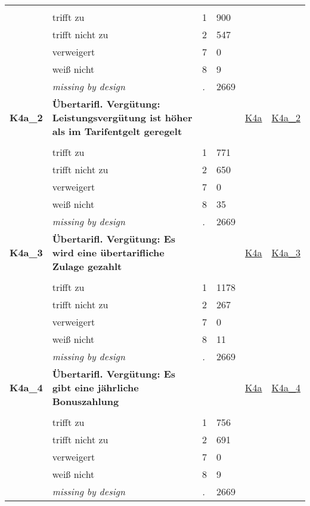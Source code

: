 \begin{longtable}{| L{2.45cm} | L{6cm} | C{1.5cm} | R{1cm} | C{2.25cm} | C{2.25cm} |}
   &  &  &  &  &  \\ 
   & trifft zu & 1 & 900 &  &  \\ 
   & trifft nicht zu & 2 & 547 &  &  \\ 
   & verweigert & 7 & 0 &  &  \\ 
   & weiß nicht & 8 & 9 &  &  \\ 
   & \textit{missing by design} & \textit{.} & 2669 &  &  \\ 
   \midrule
\textbf{K4a\_2}\label{var:K4a:2} & \textbf{Übertarifl. Vergütung: Leistungsvergütung ist höher als im Tarifentgelt geregelt} &  &  & \hyperref[K4a]{K4a} & \hyperref[var:suf:K4a:2]{K4a\_2} \\ 
   &  &  &  &  &  \\ 
   & trifft zu & 1 & 771 &  &  \\ 
   & trifft nicht zu & 2 & 650 &  &  \\ 
   & verweigert & 7 & 0 &  &  \\ 
   & weiß nicht & 8 & 35 &  &  \\ 
   & \textit{missing by design} & \textit{.} & 2669 &  &  \\ 
   \midrule
\textbf{K4a\_3}\label{var:K4a:3} & \textbf{Übertarifl. Vergütung: Es wird eine übertarifliche Zulage gezahlt} &  &  & \hyperref[K4a]{K4a} & \hyperref[var:suf:K4a:3]{K4a\_3} \\ 
   &  &  &  &  &  \\ 
   & trifft zu & 1 & 1178 &  &  \\ 
   & trifft nicht zu & 2 & 267 &  &  \\ 
   & verweigert & 7 & 0 &  &  \\ 
   & weiß nicht & 8 & 11 &  &  \\ 
   & \textit{missing by design} & \textit{.} & 2669 &  &  \\ 
   \midrule
\textbf{K4a\_4}\label{var:K4a:4} & \textbf{Übertarifl. Vergütung: Es gibt eine jährliche Bonuszahlung} &  &  & \hyperref[K4a]{K4a} & \hyperref[var:suf:K4a:4]{K4a\_4} \\ 
   &  &  &  &  &  \\ 
   & trifft zu & 1 & 756 &  &  \\ 
   & trifft nicht zu & 2 & 691 &  &  \\ 
   & verweigert & 7 & 0 &  &  \\ 
   & weiß nicht & 8 & 9 &  &  \\ 
   & \textit{missing by design} & \textit{.} & 2669 &  &  \\ 

\end{longtable}
